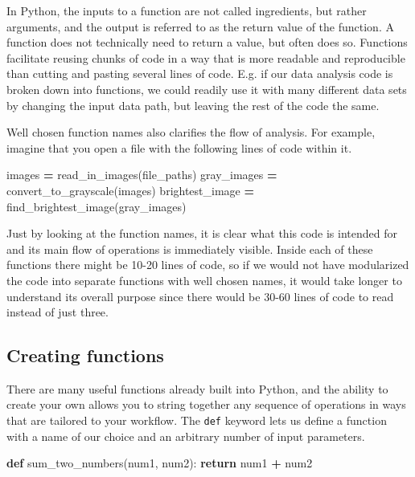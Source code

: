 \documentclass[]{Nemilov}
\newenvironment{Shaded}{\begin{snugshade}}{\end{snugshade}}
\newcommand{\ControlFlowTok}[1]{\textcolor[rgb]{0.13,0.29,0.53}{\textbf{#1}}}
\newcommand{\KeywordTok}[1]{\textcolor[rgb]{0.13,0.29,0.53}{\textbf{#1}}}
\newcommand{\NormalTok}[1]{#1}
\newcommand{\OperatorTok}[1]{\textcolor[rgb]{0.81,0.36,0.00}{\textbf{#1}}}
\begin{document}
In Python, the inputs to a function are not called ingredients, but rather
arguments, and the output is referred to as the return value of the function. A
function does not technically need to return a value, but often does so.
Functions facilitate reusing chunks of code in a way that is more readable and
reproducible than cutting and pasting several lines of code. E.g. if our data
analysis code is broken down into functions, we could readily use it with many
different data sets by changing the input data path, but leaving the rest of
the code the same.

Well chosen function names also clarifies the flow of analysis. For example,
imagine that you open a file with the following lines of code within it.

\begin{Shaded}
\begin{Highlighting}[]
\NormalTok{images }\OperatorTok{=}\NormalTok{ read_in_images(file_paths)}
\NormalTok{gray_images }\OperatorTok{=}\NormalTok{ convert_to_grayscale(images)}
\NormalTok{brightest_image }\OperatorTok{=}\NormalTok{ find_brightest_image(gray_images)}
\end{Highlighting}
\end{Shaded}

Just by looking at the function names, it is clear what this code is intended
for and its main flow of operations is immediately visible. Inside each of
these functions there might be 10-20 lines of code, so if we would not have
modularized the code into separate functions with well chosen names, it
would take longer to understand its overall purpose since there
would be 30-60 lines of code to read instead of just three.

\hypertarget{py-dev-creating-functions}{%
\subsection{Creating functions}\label{py-dev-creating-functions}}

There are many useful functions already built into Python, and the ability to
create your own allows you to string together any sequence of operations in
ways that are tailored to your workflow. The \texttt{def} keyword lets us define a
function with a name of our choice and an arbitrary number of input parameters.

\begin{Shaded}
\begin{Highlighting}[]
\KeywordTok{def}\NormalTok{ sum_two_numbers(num1, num2):}
    \ControlFlowTok{return}\NormalTok{ num1 }\OperatorTok{+}\NormalTok{ num2}
\end{Highlighting}
\end{Shaded}
\end{document}

